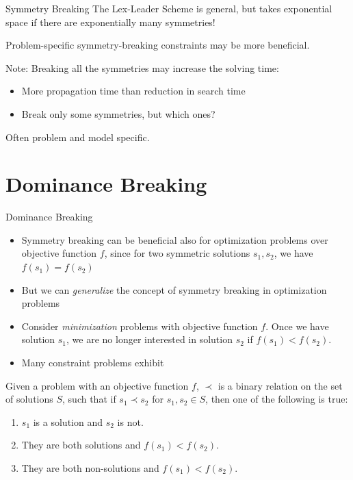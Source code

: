 \documentclass{cons-beamer}
\begin{document}
\begin{frame}{Symmetry Breaking}
  The Lex-Leader Scheme is general, but takes exponential
  space if there are exponentially many symmetries!
  \vfill

  Problem-specific symmetry-breaking constraints may be more beneficial.
  \vfill

  Note: Breaking \alert{all} the symmetries may increase the solving time:
  \begin{itemize}
    \item More propagation time than reduction in search time
    \item Break only \alert{some} symmetries, but which ones?
  \end{itemize}
  \vfill

  Often problem and model specific.
\end{frame}

\section{Dominance Breaking}

\begin{frame}{Dominance Breaking}
  \small
  \begin{itemize}
    \item Symmetry breaking can be beneficial also for optimization problems over objective function $f$, since for two symmetric solutions $s_1, s_2$, we have $f(s_1) = f(s_2)$
    \item But we can \textit{generalize} the concept of symmetry breaking in optimization problems
    \item Consider \textit{minimization} problems with objective function $f$. Once we have solution $s_1$, we are no longer interested in solution $s_2$ if $f(s_1) < f(s_2)$.
    \item Many constraint problems exhibit 
  \end{itemize}
  \begin{definition}[Dominance]
    Given a problem with an objective function $f$,  $\prec$ is a binary relation on the set of solutions $S$, such that if $s_1 \prec s_2$ for $s_1, s_2 \in S$, then one of the following is true:
    \begin{enumerate}
      \item $s_1$ is a solution and $s_2$ is not.
      \item They are both solutions and $f(s_1) < f(s_2)$.
      \item They are both non-solutions and $f(s_1) < f(s_2)$.
    \end{enumerate}
  \end{definition}
\end{frame}
\end{document}
